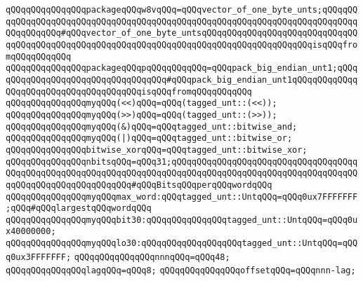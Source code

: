 \verb|qQQqqQQqqQQqqQQqpackageqQQqw8vqQQq=qQQqvector_of_one_byte_unts;qQQqqQQqqQQqqQQqqQQqqQQqqQQqqQQqqQQqqQQqqQQqqQQqqQQqqQQqqQQqqQQqqQQqqQQqqQQqqQQqqQQqqQQq#qQQqvector_of_one_byte_untsqQQqqQQqqQQqqQQqqQQqqQQqqQQqqQQqqQQqqQQqqQQqqQQqqQQqqQQqqQQqqQQqqQQqqQQqqQQqqQQqqQQqqQQqqQQqisqQQqfromqQQqqQQqqQQq|\newline
\verb|qQQqqQQqqQQqqQQqpackageqQQqpqQQqqQQqqQQq=qQQqpack_big_endian_unt1;qQQqqQQqqQQqqQQqqQQqqQQqqQQqqQQqqQQq#qQQqpack_big_endian_unt1qQQqqQQqqQQqqQQqqQQqqQQqqQQqqQQqqQQqqQQqisqQQqfromqQQqqQQqqQQq|\newline
\newline
\verb|qQQqqQQqqQQqqQQqmyqQQq(<<)qQQq=qQQq(tagged_unt::(<<));|\newline
\verb|qQQqqQQqqQQqqQQqmyqQQq(>>)qQQq=qQQq(tagged_unt::(>>));|\newline
\newline
\verb|qQQqqQQqqQQqqQQqmyqQQq(&)qQQq=qQQqtagged_unt::bitwise_and;|\newline
\verb|qQQqqQQqqQQqqQQqmyqQQq(|\verb#|)qQQq=qQQqtagged_unt::bitwise_or;#\newline
\newline
\verb|qQQqqQQqqQQqqQQqbitwise_xorqQQq=qQQqtagged_unt::bitwise_xor;|\newline
\newline
\verb|qQQqqQQqqQQqqQQqnbitsqQQq=qQQq31;qQQqqQQqqQQqqQQqqQQqqQQqqQQqqQQqqQQqqQQqqQQqqQQqqQQqqQQqqQQqqQQqqQQqqQQqqQQqqQQqqQQqqQQqqQQqqQQqqQQqqQQqqQQqqQQqqQQqqQQqqQQqqQQqqQQq#qQQqBitsqQQqperqQQqwordqQQq|\newline
\verb|qQQqqQQqqQQqqQQqmyqQQqmax_word:qQQqtagged_unt::UntqQQq=qQQq0ux7FFFFFFF;qQQq#qQQqlargestqQQqwordqQQq|\newline
\verb|qQQqqQQqqQQqqQQqmyqQQqbit30:qQQqqQQqqQQqqQQqtagged_unt::UntqQQq=qQQq0ux40000000;|\newline
\verb|qQQqqQQqqQQqqQQqmyqQQqlo30:qQQqqQQqqQQqqQQqqQQqtagged_unt::UntqQQq=qQQq0ux3FFFFFFF;|\newline
\newline
\verb|qQQqqQQqqQQqqQQqnnnqQQq=qQQq48;|\newline
\verb|qQQqqQQqqQQqqQQqlagqQQq=qQQq8;|\newline
\verb|qQQqqQQqqQQqqQQqoffsetqQQq=qQQqnnn-lag;|\newline
\newline
